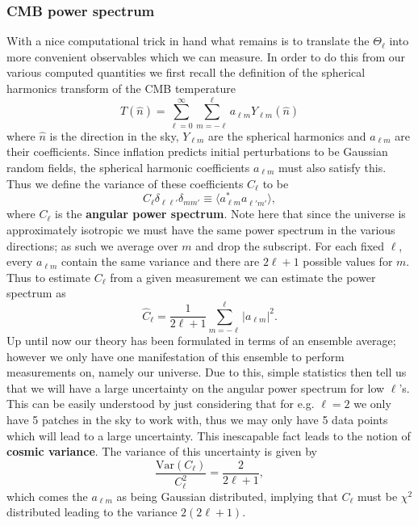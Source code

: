 \documentclass[%
reprint,
 amsmath,amssymb,
 aps,
]{revtex4-2}
\begin{document}
\subsubsection{CMB power spectrum}
With a nice computational trick in hand what remains is to translate the $\Theta_\ell$ into more convenient observables which we can measure. In order to do this from our various computed quantities we first recall the definition of the spherical harmonics transform of the CMB temperature
\[T(\hat{n})=\sum_{\ell=0}^\infty\sum_{m=-\ell}^\ell a_{\ell m}Y_{\ell m}(\hat n)\]
where $\hat{n}$ is the direction in the sky, $Y_{\ell m}$ are the spherical harmonics and $a_{\ell m}$ are their coefficients. Since inflation predicts initial perturbations to be Gaussian random fields, the spherical harmonic coefficients $a_{\ell m}$ must also satisfy this. Thus we define the variance of these coefficients $C_\ell$ to be
\[C_\ell\delta_{\ell\ell'}\delta_{mm'}\equiv\langle a_{\ell m}^*a_{\ell' m'}^{\phantom{*}}\rangle,\]
where $C_\ell$ is the \textbf{angular power spectrum}. Note here that since the universe is approximately isotropic we must have the same power spectrum in the various directions; as such we average over $m$ and drop the subscript. For each fixed $\ell$, every $a_{\ell m}$ contain the same variance and there are $2\ell+1$ possible values for $m$. Thus to estimate $C_\ell$ from a given measurement we can estimate the power spectrum as
\[\hat C_\ell=\frac{1}{2\ell+1}\sum_{m=-\ell}^\ell |a_{\ell m}|^2.\]
Up until now our theory has been formulated in terms of an ensemble average; however we only have one manifestation of this ensemble to perform measurements on, namely our universe. Due to this, simple statistics then tell us that we will have a large uncertainty on the angular power spectrum for low $\ell$'s. This can be easily understood by just considering that for e.g. $\ell=2$ we only have 5 patches in the sky to work with, thus we may only have 5 data points which will lead to a large uncertainty. This inescapable fact leads to the notion of \textbf{cosmic variance}. The variance of this uncertainty is given by \cite{AST5220LectureNotes}
\[\frac{\text{Var}(C_\ell)}{C_\ell^2}=\frac{2}{2\ell+1},\]
which comes the $a_{\ell m}$ as being Gaussian distributed, implying that $C_\ell$ must be $\chi^2$ distributed leading to the variance $2(2\ell+1)$.
\end{document}
